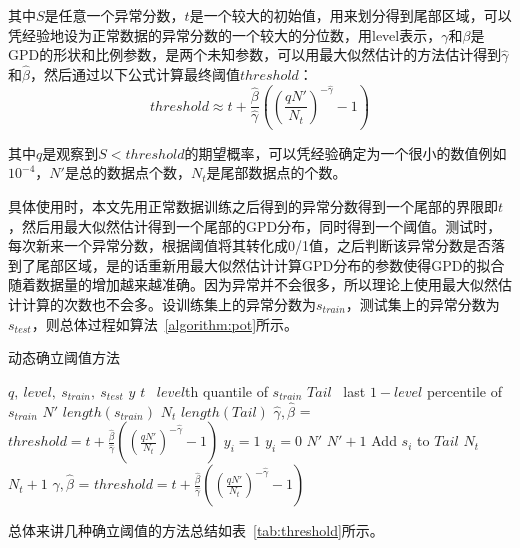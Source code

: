 其中$S$是任意一个异常分数，$t$是一个较大的初始值，用来划分得到尾部区域，可以凭经验地设为正常数据的异常分数的一个较大的分位数，用level表示，$\gamma$和$\beta$是GPD的形状和比例参数，是两个未知参数，可以用最大似然估计的方法估计得到$\hat{\gamma}$和$\hat{\beta}$，然后通过以下公式计算最终阈值$threshold$：
\begin{equation*}
  threshold \approx t + \frac{\hat{\beta}}{\hat{\gamma}}((\frac{qN'}{N_{t}})^{-\hat{\gamma}}-1)
\end{equation*}

其中$q$是观察到$S<threshold$的期望概率，可以凭经验确定为一个很小的数值例如$10^{-4}$，$N'$是总的数据点个数，$N_{t}$是尾部数据点的个数。

具体使用时，本文先用正常数据训练之后得到的异常分数得到一个尾部的界限即$t$，然后用最大似然估计得到一个尾部的GPD分布，同时得到一个阈值。测试时，每次新来一个异常分数，根据阈值将其转化成0/1值，之后判断该异常分数是否落到了尾部区域，是的话重新用最大似然估计计算GPD分布的参数使得GPD的拟合随着数据量的增加越来越准确。因为异常并不会很多，所以理论上使用最大似然估计计算的次数也不会多。设训练集上的异常分数为$s_{train}$，测试集上的异常分数为$s_{test}$，则总体过程如算法~\ref{algorithm:pot}所示。 

\begin{algorithm}
  \caption{动态确立阈值方法}
  \begin{algorithmic}[1]
      \Require $q,\ level,\ s_{train},\ s_{test}$
      \Ensure $y$
      \State $t$ \gets \ $level$th quantile of $s_{train}$
      \State $Tail$ \gets \ last $1-level$ percentile of $s_{train}$
      \State $N'$ \gets $length(s_{train})$
      \State $N_t$ \gets $length(Tail)$
      \State $\hat{\gamma}, \hat{\beta}$ = 
      \State $threshold = t + \frac{\hat{\beta}}{\hat{\gamma}}((\frac{qN'}{N_{t}})^{-\hat{\gamma}}-1)$
      \State $y_i = 1$
      \Else \State $y_i = 0$
      \EndIf
      \State $N'$ \gets $N' + 1 $
      \State Add $s_i$ to $Tail$
      \State $N_t$ \gets $N_t + 1$
      \State $\hat{\gamma}, \hat{\beta}$ = 
      \State $threshold = t + \frac{\hat{\beta}}{\hat{\gamma}}((\frac{qN'}{N_{t}})^{-\hat{\gamma}}-1)$ 
      \EndIf
      \EndFor
  \end{algorithmic}
  \label{algorithm:pot}
\end{algorithm}

总体来讲几种确立阈值的方法总结如表~\ref{tab:threshold}所示。


